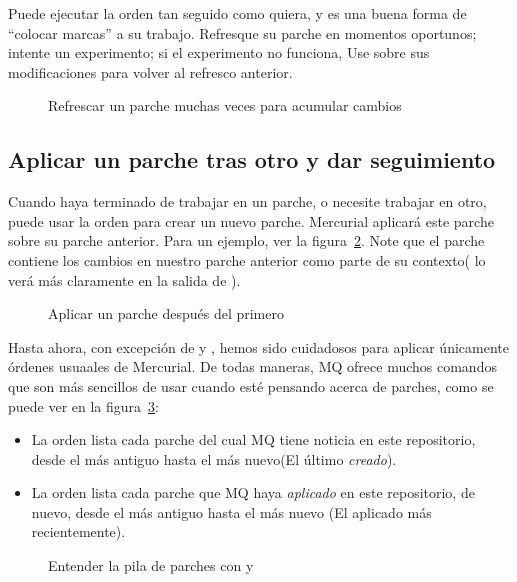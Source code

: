 Puede ejecutar la orden  tan seguido como quiera,
y es una buena forma de ``colocar marcas'' a su trabajo.  Refresque su
parche en momentos oportunos; intente un experimento; si el
experimento no funciona, Use  sobre sus modificaciones
para volver al refresco anterior.

\begin{figure}[ht]
  \caption{Refrescar un parche muchas veces para acumular cambios}
  \label{ex:mq:qrefresh2}
\end{figure}

\subsection{Aplicar un parche tras otro y dar seguimiento}

Cuando haya terminado de trabajar en un parche, o necesite trabajar en
otro, puede usar la orden  para crear un nuevo
parche.  Mercurial aplicará este parche sobre su parche anterior.
Para un ejemplo, ver la figura~\ref{ex:mq:qnew2}.  Note que el parche
contiene los cambios en nuestro parche anterior como parte de su
contexto( lo verá más claramente en la salida de ).

\begin{figure}[ht]
  \caption{Aplicar un parche después del primero}
  \label{ex:mq:qnew2}
\end{figure}

Hasta ahora, con excepción de  y
, hemos sido cuidadosos para aplicar únicamente
órdenes usuaales de Mercurial.  De todas maneras, MQ ofrece muchos
comandos que son más sencillos de usar cuando esté pensando acerca de
parches, como se puede ver en la figura~\ref{ex:mq:qseries}:

\begin{itemize}
\item La orden  lista cada parche del cual MQ
  tiene noticia en este repositorio, desde el más antiguo hasta el más
  nuevo(El último \emph{creado}).
\item La orden  lista cada parche que MQ haya
  \emph{aplicado} en este repositorio, de nuevo, desde el más antiguo
  hasta el más nuevo (El aplicado más recientemente).
\end{itemize}

\begin{figure}[ht]
  \caption{Entender la pila de parches con  y
    }
  \label{ex:mq:qseries}
\end{figure}

